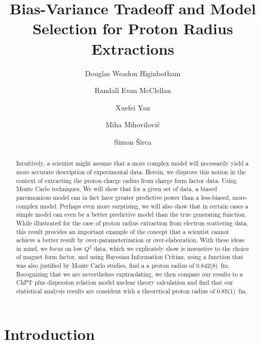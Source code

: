 \documentclass[10pt,aps,prc,twocolumn]{revtex4-1}
\begin{document}
\title{Bias-Variance Tradeoff and Model Selection for Proton Radius Extractions}

\author{Douglas Weadon Higinbotham}
\author{Randall Evan McClellan}

\author{Xuefei Yan}

\author{Miha Mihovilovi\v{c}}
\author{Simon \v{S}irca}

\begin{abstract}
Intuitively, a scientist might assume that a more complex model will necessarily yield a more 
accurate description of experimental data.   Herein, we disprove this notion in the context of extracting 
the proton charge radius from charge form factor data.   Using Monte Carlo techniques, We will show that 
for a given set of data, a biased parsimonious model can in fact have greater predictive power than a 
less-biased, more-complex model.  Perhaps even more surprising, we will also show that in certain cases a simple model 
can even be a better predictive model than the true generating function.   While illustrated for the case of proton
radius extraction from electron scattering data, this result provides an important example of the concept that 
a scientist cannot achieve a better result by over-parameterization or over-elaboration. 
With these ideas in mind, we focus on low $Q^2$ data, which we explicately show is insenstive to the choice of magnet form factor, 
and using Bayesian Information Critian, using a function that was also justified by Monte Carlo studies, find a 
a proton radius of 0.842(8)~fm.    Recognizing that we are nevertheless exptraolating, we then compare our 
results to a ChPT plus dispersion relation model nuclear theory calculation and find that our statistical analysis 
results are consident with a theoretical proton radius of 0.85(1)~fm.   

\end{abstract}

\maketitle

\section{Introduction}
\end{document}
